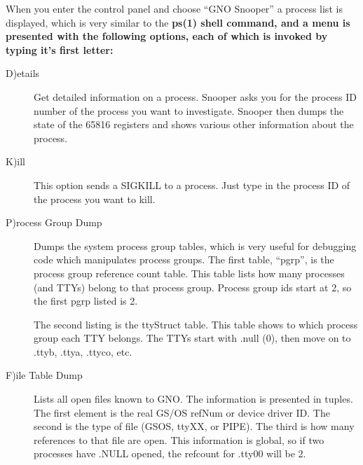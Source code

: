\documentclass{report}
\begin{document}
When you enter the control panel and choose
``GNO Snooper'' a process list is displayed, which is
very similar to the \bf ps\rm(1) shell command, and a menu is presented
with the following options, each of which is invoked by typing it's
first letter:

\begin{description}
\item[D)etails]

Get detailed information on a process.
Snooper asks you for the process ID number of the process you
want to investigate. Snooper then dumps the state of the 65816
registers and shows various other information about the process.

\item[K)ill]

This option sends a SIGKILL to a process. Just type in the process ID
of the process you want to kill.

\item[P)rocess Group Dump]

Dumps the system process group tables,
which is very useful for debugging code which manipulates process
groups. The first table, ``pgrp'', is the process group reference
count table. This table lists how many processes (and TTYs)
belong to that process group. 
Process group ids start at 2, so the first pgrp listed is 2.

The second listing is the ttyStruct table.
This table shows to which process group each TTY belongs. The TTYs start
with .null (0), then move on to .ttyb, .ttya, .ttyco, etc.

\item[F)ile Table Dump]

Lists all open files known to GNO.
The information is presented in tuples. The first element is the
real GS/OS refNum or device driver ID. The second is the type of
file (GSOS, ttyXX, or PIPE). The third is how many references to
that file are open. This information is global, so if two
processes have .NULL opened, the refcount for .tty00 will be 2.

\end{description}



\parindent=20pt
\end{document}
